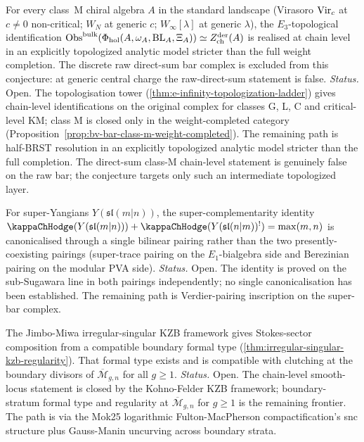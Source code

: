 \begin{conjecture}
\ClaimStatusConjectured
For every class~M chiral algebra $A$ in the standard landscape
(Virasoro $\mathrm{Vir}_{c}$ at $c \neq 0$ non-critical; $W_{N}$ at generic
$c$; $W_{\infty}[\lambda]$ at generic $\lambda$), the
	$E_{3}$-topological identification
	$\mathrm{Obs}^{\mathrm{bulk}}(\Phi_{\mathrm{hol}}(A,\omega_A,\mathrm{BL}_A,\Xi_A))
	\simeq Z^{\mathrm{der}}_{\mathrm{ch}}(A)$ is realised at chain
level in an explicitly topologized analytic model stricter than the
full weight completion. The discrete raw direct-sum bar complex is
excluded from this conjecture: at generic central charge the
raw-direct-sum statement is false.
\emph{Status.} Open. The topologisation tower
(\cref{thm:e-infinity-topologization-ladder}) gives chain-level
identifications on the original complex for classes G, L, C and
critical-level KM; class M is closed only in the weight-completed
category (Proposition~\ref*{prop:bv-bar-class-m-weight-completed}).
The remaining path is half-BRST resolution in an explicitly
topologized analytic model stricter than the full completion. The
direct-sum class-M chain-level statement is genuinely false on the
raw bar; the conjecture targets only such an intermediate
topologized layer.
\end{conjecture}

\begin{conjecture}[\label{conj:f4-super-complementarity-canonical}F4:
canonical pairing for super-complementarity
$\kappaChHodge+{\kappaChHodge}^{!} = \max(m, n)$]
\ClaimStatusConjectured
For super-Yangians $Y(\mathfrak{sl}(m | n))$, the
super-complementarity identity
$\kappaChHodge(Y(\mathfrak{sl}(m | n))) +
\kappaChHodge(Y(\mathfrak{sl}(n | m))^{!}) = \max(m, n)$
is canonicalised through a single bilinear pairing rather than the
two presently-coexisting pairings (super-trace pairing on the
$E_{1}$-bialgebra side and Berezinian pairing on the modular PVA
side).
\emph{Status.} Open. The identity is proved on the sub-Sugawara
line in both pairings independently; no single canonicalisation has
been established. The remaining path is
Verdier-pairing inscription on the super-bar complex.
\end{conjecture}

\begin{conjecture}
\ClaimStatusConjectured
The Jimbo-Miwa irregular-singular KZB framework gives
Stokes-sector composition from a compatible boundary formal type
(\cref{thm:irregular-singular-kzb-regularity}). That formal type
exists and is compatible with clutching at the boundary divisors of
$\overline{\mathcal{M}}_{g, n}$ for all $g \ge 1$.
\emph{Status.} Open. The chain-level smooth-locus statement is
closed by the Kohno-Felder KZB framework; boundary-stratum formal
type and regularity at $\overline{\mathcal{M}}_{g, n}$ for
$g \ge 1$ is the remaining frontier. The path is via the Mok25 logarithmic
Fulton-MacPherson compactification's snc structure plus
Gauss-Manin uncurving across boundary strata.
\end{conjecture}

